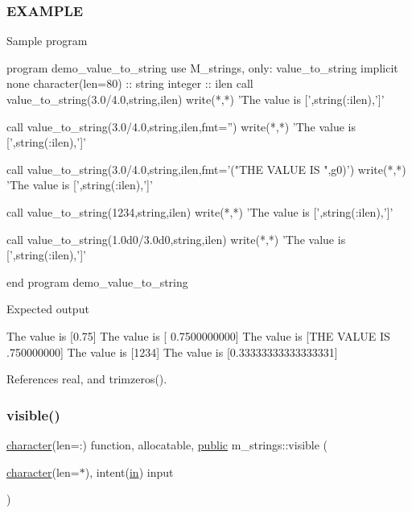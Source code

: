 \subsubsection*{E\+X\+A\+M\+P\+LE}

\begin{DoxyVerb}Sample program

  program demo_value_to_string
  use M_strings, only: value_to_string
  implicit none
  character(len=80) :: string
  integer           :: ilen
     call value_to_string(3.0/4.0,string,ilen)
     write(*,*) 'The value is [',string(:ilen),']'

     call value_to_string(3.0/4.0,string,ilen,fmt='')
     write(*,*) 'The value is [',string(:ilen),']'

     call value_to_string(3.0/4.0,string,ilen,fmt='("THE VALUE IS ",g0)')
     write(*,*) 'The value is [',string(:ilen),']'

     call value_to_string(1234,string,ilen)
     write(*,*) 'The value is [',string(:ilen),']'

     call value_to_string(1.0d0/3.0d0,string,ilen)
     write(*,*) 'The value is [',string(:ilen),']'

  end program demo_value_to_string

Expected output

 The value is [0.75]
 The value is [      0.7500000000]
 The value is [THE VALUE IS .750000000]
 The value is [1234]
 The value is [0.33333333333333331] \end{DoxyVerb}
 

References real, and trimzeros().

\mbox{\label{namespacem__strings_a791e24ceb690010fd42a6c1f48311b55}} 
\subsubsection{\texorpdfstring{visible()}{visible()}}
{\footnotesize\ttfamily \hyperlink{option__stopwatch_83_8txt_abd4b21fbbd175834027b5224bfe97e66}{character}(len=\+:) function, allocatable, \hyperlink{M__stopwatch_83_8txt_a2f74811300c361e53b430611a7d1769f}{public} m\+\_\+strings\+::visible (\begin{DoxyParamCaption}\item[{\hyperlink{option__stopwatch_83_8txt_abd4b21fbbd175834027b5224bfe97e66}{character}(len=$\ast$), intent(\hyperlink{M__journal_83_8txt_afce72651d1eed785a2132bee863b2f38}{in})}]{input }\end{DoxyParamCaption})}



